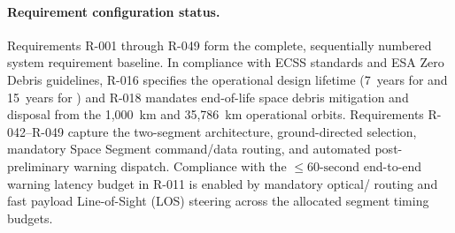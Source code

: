 \paragraph{Requirement configuration status.}
Requirements R-001 through R-049 form the complete, sequentially numbered system requirement baseline. In compliance with ECSS standards and ESA Zero Debris guidelines, R-016 specifies the operational design lifetime (7~years for  and 15~years for ) and R-018 mandates end-of-life space debris mitigation and disposal from the 1,000~km  and 35,786~km  operational orbits. Requirements R-042--R-049 capture the two-segment architecture, ground-directed  selection, mandatory Space Segment  command/data routing, and automated post- preliminary warning dispatch. Compliance with the $\le 60\text{-second}$ end-to-end warning latency budget in R-011 is enabled by mandatory optical/  routing and fast payload Line-of-Sight (LOS) steering across the allocated segment timing budgets.
